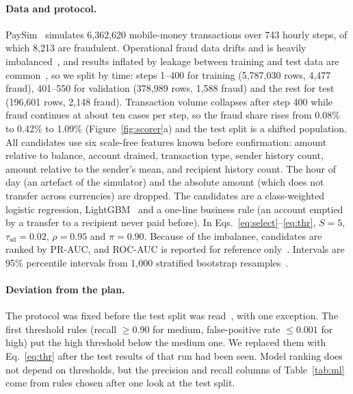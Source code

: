 \documentclass[10pt,a4paper]{article}
\theoremstyle{tight}
\begin{document}
\paragraph{Data and protocol.} PaySim~\cite{lopezrojas2016} simulates 6,362,620 mobile-money transactions over 743
hourly steps, of which 8,213 are fraudulent. Operational fraud data drifts and is heavily
imbalanced~\cite{dalpozzolo2018}, and results inflated by leakage between training and test data are
common~\cite{kapoor2023}, so we split by time: steps 1--400 for training (5,787,030 rows, 4,477 fraud), 401--550 for
validation (378,989 rows, 1,588 fraud) and the rest for test (196,601 rows, 2,148 fraud). Transaction volume
collapses after step 400 while fraud continues at about ten cases per step, so the fraud share rises from 0.08\% to
0.42\% to 1.09\% (Figure~\ref{fig:scorer}a) and the test split is a shifted population. All candidates use six scale-free features known before confirmation: amount relative to balance, account drained,
transaction type, sender history count, amount relative to the sender's mean, and recipient history count. The hour
of day (an artefact of the simulator) and the absolute amount (which does not transfer across currencies) are
dropped. The candidates are a class-weighted
logistic regression, LightGBM~\cite{ke2017} and a one-line business rule (an account emptied by a transfer to a
recipient never paid before). In Eqs.~\eqref{eq:select}--\eqref{eq:thr}, $S=5$, $\tau_{\mathrm{sd}}=0.02$,
$\rho=0.95$ and $\pi=0.90$. Because of the imbalance, candidates are ranked by PR-AUC, and ROC-AUC is reported for
reference only~\cite{davis2006,saito2015}. Intervals are 95\% percentile intervals from 1,000 stratified bootstrap
resamples~\cite{efron1979}.

\paragraph{Deviation from the plan.} The protocol was fixed before the test split was read~\cite{nosek2018}, with
one exception. The first threshold rules (recall $\ge 0.90$ for medium, false-positive rate $\le 0.001$ for high) put
the high threshold below the medium one. We replaced them with Eq.~\eqref{eq:thr} after the test results of that run
had been seen. Model ranking does not depend on thresholds, but the precision and recall columns of
Table~\ref{tab:ml} come from rules chosen after one look at the test split.
\end{document}
